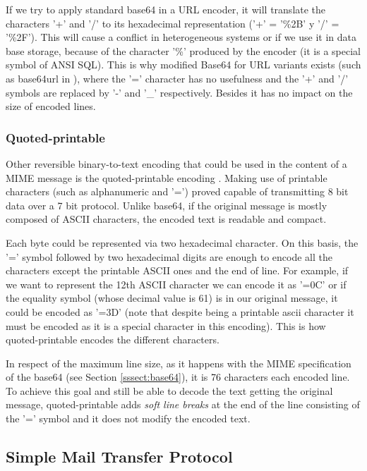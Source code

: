 If we try to apply standard base64 in a URL encoder, it will translate the characters '+' and '/' to its hexadecimal representation ('+' = '\%2B' y '/' = '\%2F'). This will cause a conflict in heterogeneous systems or if we use it in data base storage, because of the character '\%' produced by the encoder (it is a special symbol of ANSI SQL). This is why modified Base64 for URL variants exists (such as base64url in \cite{rfc4648}), where the '=' character has no usefulness and the '+' and '/' symbols are replaced by '-' and '\_' respectively. Besides it has no impact on the size of encoded lines.

\subsubsection{Quoted-printable} \label{sssect:quot-p}
Other reversible binary-to-text encoding that could be used in the content of a MIME message is the quoted-printable encoding \citep{wikiquotprint, rfc1521}. Making use of printable characters (such as alphanumeric and '=') proved capable of transmitting 8 bit data over a 7 bit protocol. Unlike base64, if the original message is mostly composed of ASCII characters, the encoded text is readable and compact.

Each byte could be represented via two hexadecimal character. On this basis, the '=' symbol followed by two hexadecimal digits are enough to encode all the characters except the printable ASCII ones and the end of line. For example, if we want to represent the 12th ASCII character we can encode it as '=0C' or if the equality symbol (whose decimal value is 61) is in our original message, it could be encoded as '=3D' (note that despite being a printable ascii character it must be encoded as it is a special character in this encoding). This is how quoted-printable encodes the different characters.

In respect of the maximum line size, as it happens with the MIME specification of the base64 (see Section \ref{sssect:base64}), it is 76 characters each encoded line. To achieve this goal and still be able to decode the text getting the original message, quoted-printable adds \textit{soft line breaks} at the end of the line consisting of the '=' symbol and it does not modify the encoded text.

\subsection{Simple Mail Transfer Protocol} \label{ssect:smtp}

